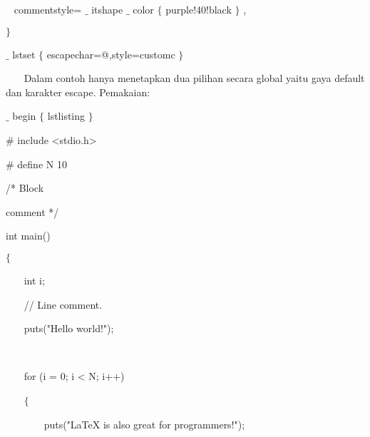 {\fontsize{10pt}{10pt}\selectfont ~ commentstyle= $ \_ $ itshape $ \_ $ color $ \{ $ purple!40!black $ \} $ ,}\par

{\fontsize{10pt}{10pt}\selectfont  $ \} $ }\par

{\fontsize{10pt}{10pt}\selectfont  $ \_ $ lstset $ \{ $ escapechar=@,style=customc $ \} $ }\par


\noindent ~~~ Dalam contoh hanya menetapkan dua pilihan secara global yaitu gaya default dan karakter escape. Pemakaian:\par

{\fontsize{10pt}{10pt}\selectfont  $ \_ $ begin $ \{ $ lstlisting $ \} $ }\par

{\fontsize{10pt}{10pt}\selectfont  $\#$ include <stdio.h>}\par

{\fontsize{10pt}{10pt}\selectfont  $\#$ define N 10}\par

{\fontsize{10pt}{10pt}\selectfont /* Block}\par

{\fontsize{10pt}{10pt}\selectfont  * comment */}\par

{\fontsize{10pt}{10pt}\selectfont int main()}\par

{\fontsize{10pt}{10pt}\selectfont  $ \{ $ }\par

{\fontsize{10pt}{10pt}\selectfont ~~~ int i;}\par

{\fontsize{10pt}{10pt}\selectfont ~~~ // Line comment.}\par

{\fontsize{10pt}{10pt}\selectfont ~~~ puts("Hello world!");}\par

{\fontsize{10pt}{10pt}\selectfont ~~~ }\par

{\fontsize{10pt}{10pt}\selectfont ~~~ for (i = 0; i < N; i++)}\par

{\fontsize{10pt}{10pt}\selectfont ~~~  $ \{ $ }\par

{\fontsize{10pt}{10pt}\selectfont ~~~~~~~ puts("LaTeX is also great for programmers!");}\par

